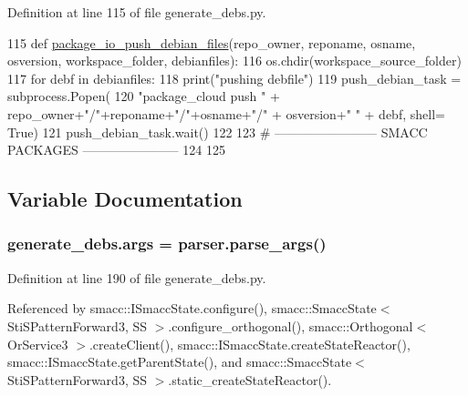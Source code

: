 Definition at line 115 of file generate\+\_\+debs.\+py.


\begin{DoxyCode}
115 \textcolor{keyword}{def }\hyperlink{namespacegenerate__debs_acccc6dc6a3037e10949cfa377d1a7d18}{package\_io\_push\_debian\_files}(repo\_owner, reponame,  osname, osversion, 
      workspace\_folder, debianfiles):
116     os.chdir(workspace\_source\_folder)
117     \textcolor{keywordflow}{for} debf \textcolor{keywordflow}{in} debianfiles:
118         print(\textcolor{stringliteral}{"pushing debfile"})
119         push\_debian\_task = subprocess.Popen(
120             \textcolor{stringliteral}{"package\_cloud push "} + repo\_owner+\textcolor{stringliteral}{"/"}+reponame+\textcolor{stringliteral}{"/"}+osname+\textcolor{stringliteral}{"/"} + osversion+\textcolor{stringliteral}{" "} + debf, shell=\textcolor{keyword}{
      True})
121         push\_debian\_task.wait()
122 
123 \textcolor{comment}{# ------------------------ SMACC PACKAGES -----------------------}
124 
125 
\end{DoxyCode}


\subsection{Variable Documentation}
\subsubsection[{\texorpdfstring{args}{args}}]{\setlength{\rightskip}{0pt plus 5cm}generate\+\_\+debs.\+args = parser.\+parse\+\_\+args()}\hypertarget{namespacegenerate__debs_a75f9143e38df82d83b2e8a6f99cae02c}{}\label{namespacegenerate__debs_a75f9143e38df82d83b2e8a6f99cae02c}


Definition at line 190 of file generate\+\_\+debs.\+py.



Referenced by smacc\+::\+I\+Smacc\+State.\+configure(), smacc\+::\+Smacc\+State$<$ Sti\+S\+Pattern\+Forward3, S\+S $>$.\+configure\+\_\+orthogonal(), smacc\+::\+Orthogonal$<$ Or\+Service3 $>$.\+create\+Client(), smacc\+::\+I\+Smacc\+State.\+create\+State\+Reactor(), smacc\+::\+I\+Smacc\+State.\+get\+Parent\+State(), and smacc\+::\+Smacc\+State$<$ Sti\+S\+Pattern\+Forward3, S\+S $>$.\+static\+\_\+create\+State\+Reactor().

